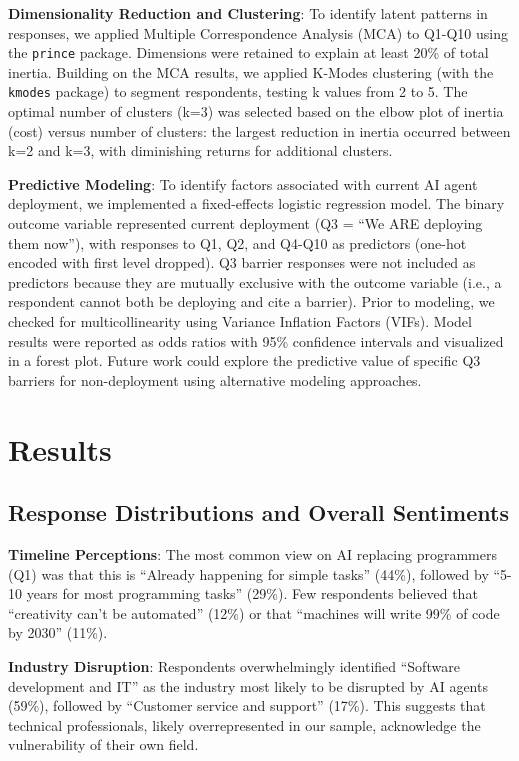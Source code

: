 \documentclass{article}
\begin{document}
\textbf{Dimensionality Reduction and Clustering}: To identify latent
patterns in responses, we applied Multiple Correspondence Analysis (MCA)
to Q1-Q10 using the \texttt{prince} package. Dimensions were retained to
explain at least 20\% of total inertia. Building on the MCA results, we
applied K-Modes clustering (with the \texttt{kmodes} package) to segment
respondents, testing k values from 2 to 5. The optimal number of
clusters (k=3) was selected based on the elbow plot of inertia (cost)
versus number of clusters: the largest reduction in inertia occurred
between k=2 and k=3, with diminishing returns for additional clusters.

\textbf{Predictive Modeling}: To identify factors associated with
current AI agent deployment, we implemented a fixed-effects logistic
regression model. The binary
outcome variable represented current deployment (Q3 = ``We ARE deploying
them now''), with responses to Q1, Q2, and Q4-Q10 as predictors (one-hot
encoded with first level dropped). Q3 barrier responses were not
included as predictors because they are mutually exclusive with the
outcome variable (i.e., a respondent cannot both be deploying and cite a
barrier). Prior to modeling, we checked for multicollinearity using
Variance Inflation Factors (VIFs). Model results were reported as odds
ratios with 95\% confidence intervals and visualized in a forest plot.
Future work could explore the predictive value of specific Q3 barriers
for non-deployment using alternative modeling approaches.

\section{Results}\label{results}

\subsection{Response Distributions and Overall
Sentiments}\label{response-distributions-and-overall-sentiments}

\textbf{Timeline Perceptions}: The most common view on AI replacing
programmers (Q1) was that this is ``Already happening for simple tasks''
(44\%), followed by ``5-10 years for most programming tasks'' (29\%).
Few respondents believed that ``creativity can't be automated'' (12\%)
or that ``machines will write 99\% of code by 2030'' (11\%).

\textbf{Industry Disruption}: Respondents overwhelmingly identified
``Software development and IT'' as the industry most likely to be
disrupted by AI agents (59\%), followed by ``Customer service and
support'' (17\%). This suggests that technical professionals, likely
overrepresented in our sample, acknowledge the vulnerability of their
own field.
\end{document}
